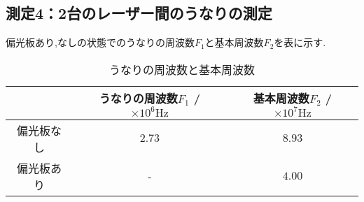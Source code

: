 \subsection{測定4：2台のレーザー間のうなりの測定}
偏光板あり,なしの状態でのうなりの周波数$F_1$と基本周波数$F_2$を表に示す.
\begin{table}[h]
\caption{うなりの周波数と基本周波数}
\label{tab:unari_kihon}
\centering
\begin{tabular}{ccc}
\hline
&うなりの周波数$F_1$ / $\times10^6\si{\hertz}$&基本周波数$F_2$ / $\times10^7\si{\hertz}$\\
\hline \hline
偏光板なし&$2.73$&$8.93$\\
偏光板あり&-&$4.00$\\
\hline
\end{tabular}
\end{table}